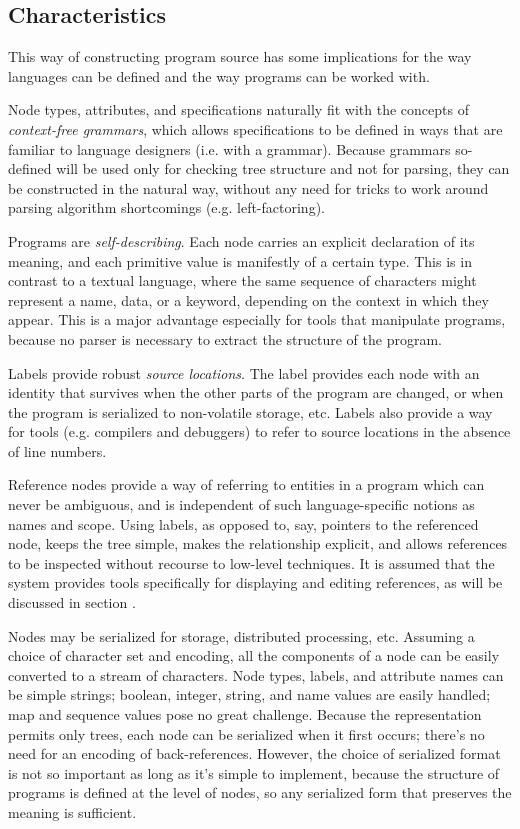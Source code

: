 

\subsection{Characteristics}
This way of constructing program source has some implications for the way languages can be defined and the way programs can be worked with.

Node types, attributes, and specifications naturally fit with the concepts of \emph{context-free grammars}, which allows specifications to be defined in ways that are familiar to language designers (i.e. with a grammar). Because grammars so-defined will be used only for checking tree structure and not for parsing, they can be constructed in the natural way, without any need for tricks to work around parsing algorithm shortcomings (e.g. left-factoring).

Programs are \emph{self-describing}. Each node carries an explicit declaration of its meaning, and each primitive value is manifestly of a certain type. This is in contrast to a textual language, where the same sequence of characters might represent a name, data, or a keyword, depending on the context in which they appear. This is a major advantage especially for tools that manipulate programs, because no parser is necessary to extract the structure of the program.

Labels provide robust \emph{source locations}. The label provides each node with an identity that survives when the other parts of the program are changed, or when the program is serialized to non-volatile storage, etc. Labels also provide a way for tools (e.g. compilers and debuggers) to refer to source locations in the absence of line numbers. 

Reference nodes provide a way of referring to entities in a program which can never be ambiguous, and is independent of such language-specific notions as names and scope. Using labels, as opposed to, say, pointers to the referenced node, keeps the tree simple, makes the relationship explicit, and allows references to be inspected without recourse to low-level techniques. It is assumed that the system provides tools specifically for displaying and editing references, as will be discussed in section .

Nodes may be serialized for storage, distributed processing, etc. Assuming a choice of character set and encoding, all the components of a node can be easily converted to a stream of characters. Node types, labels, and attribute names can be simple strings; boolean, integer, string, and name values are easily handled; map and sequence values pose no great challenge. Because the representation permits only trees, each node can be serialized when it first occurs; there's no need for an encoding of back-references. However, the choice of serialized format is not so important as long as it's simple to implement, because the structure of programs is defined at the level of nodes, so any serialized form that preserves the meaning is sufficient.


